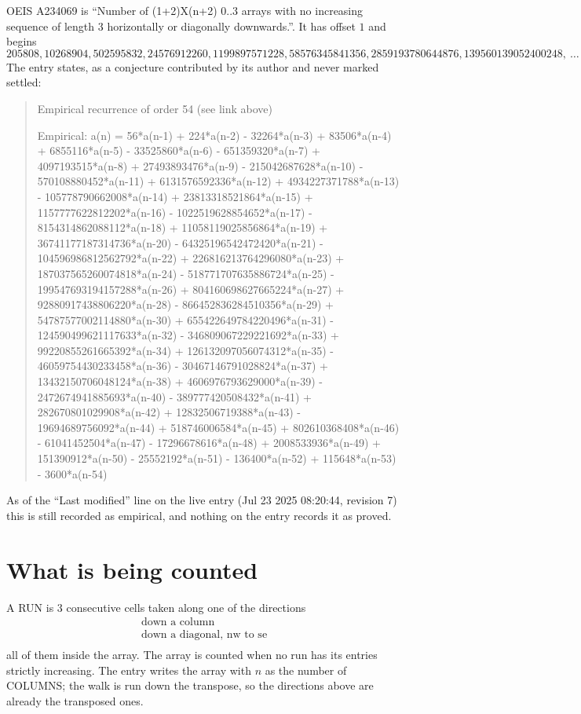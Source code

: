 \documentclass[11pt,a4paper]{article}
\theoremstyle{plain}
\theoremstyle{definition}
\begin{document}
OEIS A234069 is ``Number of (1+2)X(n+2) 0..3 arrays with no increasing sequence of length 3 horizontally or diagonally downwards.''. It has offset $1$ and begins
\[
205808, 10268904, 502595832, 24576912260, 1199897571228, 58576345841356, 2859193780644876, 139560139052400248,\ \dots
\]
The entry states, as a conjecture contributed by its author and never marked settled:
\begin{quote}
Empirical recurrence of order 54 (see link above)

Empirical: a(n) = 56*a(n-1) + 224*a(n-2) - 32264*a(n-3) + 83506*a(n-4) + 6855116*a(n-5) - 33525860*a(n-6) - 651359320*a(n-7) + 4097193515*a(n-8) + 27493893476*a(n-9) - 215042687628*a(n-10) - 570108880452*a(n-11) + 6131576592336*a(n-12) + 4934227371788*a(n-13) - 105778790662008*a(n-14) + 23813318521864*a(n-15) + 1157777622812202*a(n-16) - 1022519628854652*a(n-17) - 8154314862088112*a(n-18) + 11058119025856864*a(n-19) + 36741177187314736*a(n-20) - 64325196542472420*a(n-21) - 104596986812562792*a(n-22) + 226816213764296080*a(n-23) + 187037565260074818*a(n-24) - 518771707635886724*a(n-25) - 199547693194157288*a(n-26) + 804160698627665224*a(n-27) + 92880917438806220*a(n-28) - 866452836284510356*a(n-29) + 54787577002114880*a(n-30) + 655422649784220496*a(n-31) - 124590499621117633*a(n-32) - 346809067229221692*a(n-33) + 99220855261665392*a(n-34) + 126132097056074312*a(n-35) - 46059754430233458*a(n-36) - 30467146791028824*a(n-37) + 13432150706048124*a(n-38) + 4606976793629000*a(n-39) - 2472674941885693*a(n-40) - 389777420508432*a(n-41) + 282670801029908*a(n-42) + 12832506719388*a(n-43) - 19694689756092*a(n-44) + 518746006584*a(n-45) + 802610368408*a(n-46) - 61041452504*a(n-47) - 17296678616*a(n-48) + 2008533936*a(n-49) + 151390912*a(n-50) - 25552192*a(n-51) - 136400*a(n-52) + 115648*a(n-53) - 3600*a(n-54)
\end{quote}
As of the ``Last modified'' line on the live entry (Jul 23 2025 08:20:44, revision 7) this is still
recorded as empirical, and nothing on the entry records it as proved.

\section{What is being counted}

A RUN is $3$ consecutive cells taken along one of the directions
\[
\begin{array}{l}
\text{down a column} \\
\text{down a diagonal, nw to se} \\
\end{array}
\]
all of them inside the array. The array is counted when no run has its entries strictly increasing. The entry writes the array with $n$ as the number of COLUMNS; the walk is run down the transpose, so the directions above are already the transposed ones.
\end{document}
